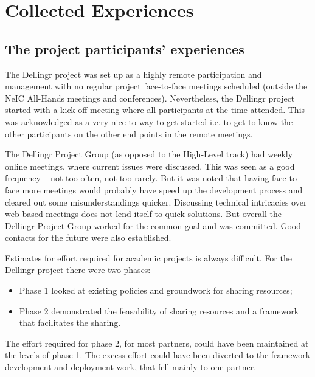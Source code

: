 \documentclass{article}
\newcommand{\dell}{Dellingr\xspace}
\newcommand{\HLT}{High-Level track\xspace}
\begin{document}
    
\section{Collected Experiences}

\subsection{The project participants’ experiences}


The \dell project was set up as a highly remote participation and management with no regular project face-to-face meetings scheduled (outside the NeIC All-Hands meetings and conferences).
Nevertheless, the \dell project started with a kick-off meeting where all participants at the time attended. 
This was acknowledged as a very nice to way to get started i.e. to get to know the other participants on the other end points in the remote meetings.

The \dell Project Group (as opposed to the \HLT) had weekly online meetings, where current issues were discussed. 
This was seen as a good frequency -- not too often, not too rarely.
But it was noted that having face-to-face more meetings would probably have speed up the development process and cleared out some misunderstandings quicker. 
Discussing technical intricacies over web-based meetings does not lend itself to quick solutions.
But overall the \dell 
Project Group worked for the common goal and was committed. 
Good contacts for the future were also established.

Estimates for effort required for academic projects is always difficult.
For the \dell project there were two phases:
\begin{itemize}
\item Phase 1 looked at existing policies and groundwork for sharing resources;
\item Phase 2 demonstrated the feasability of sharing resources and a framework that facilitates the sharing.
\end{itemize}
The effort required for phase 2, for most partners, could have been maintained at the levels of phase 1.
The excess effort could have been diverted to the framework development and deployment work, that fell mainly to one partner.
\end{document}
